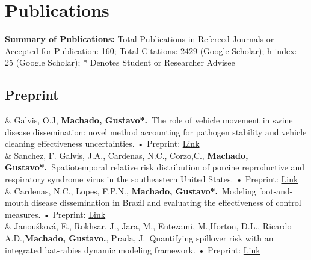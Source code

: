 \documentclass[11pt]{article}
\newcommand{\Preprint}[1]{\newline • Preprint: \faFilePdf}
\newcommand{\GitHub}[1]{\newline • Code: \faGithub\ \href{https://github.com/#1}{#1}}
\newcommand{\Year}[1]{\fontsize{10pt}{0}\selectfont #1}
\begin{document}

\section{Publications}
\textbf{Summary of Publications:} Total Publications in Refereed Journals or Accepted for
Publication: 160; Total Citations: 2429 (Google Scholar); h-index: 25 (Google Scholar); * Denotes Student or Researcher Advisee

\subsection{Preprint}
\begin{EntriesTable}


\Year{2023}  &
Galvis, O.J, {\textbf{Machado, Gustavo*.}}\
  The role of vehicle movement in swine disease dissemination: novel method accounting for pathogen stability and vehicle cleaning effectiveness uncertainties.
  \Preprint{}\href{https://arxiv.org/abs/2212.07466}{Link}
  \\
  
  \Year{2023}  &
 Sanchez, F. Galvis, J.A., Cardenas, N.C., Corzo,C., {\textbf{Machado, Gustavo*.}}\
  Spatiotemporal relative risk distribution of porcine reproductive and respiratory syndrome virus in the southeastern United States.
  \Preprint{}\href{https://arxiv.org/abs/2301.05774v2}{Link}
  \\
  
\Year{2022}  &
 Cardenas, N.C., Lopes, F.P.N., {\textbf{Machado, Gustavo*.}}\
  Modeling foot-and-mouth disease dissemination in Brazil and evaluating the effectiveness of control measures.
  \Preprint{}\href{https://www.biorxiv.org/content/10.1101/2022.06.14.496159v2}{Link}
  \\

\Year{2022}  &
Janoušková, E., Rokhsar, J., Jara, M., Entezami, M.,Horton, D.L., Ricardo A.D.,{\textbf{Machado, Gustavo.}, Prada, J.}\ Quantifying spillover risk with an integrated bat-rabies dynamic modeling framework.
  \Preprint{}\href{https://www.authorea.com/users/486249/articles/571323-quantifying-spillover-risk-with-an-integrated-bat-rabies-dynamic-modeling-framework?commit=233afa2df4b59418ea960a6a9c4034ad197a9763}{Link}
  \\
  

\end{EntriesTable}
\end{document}
